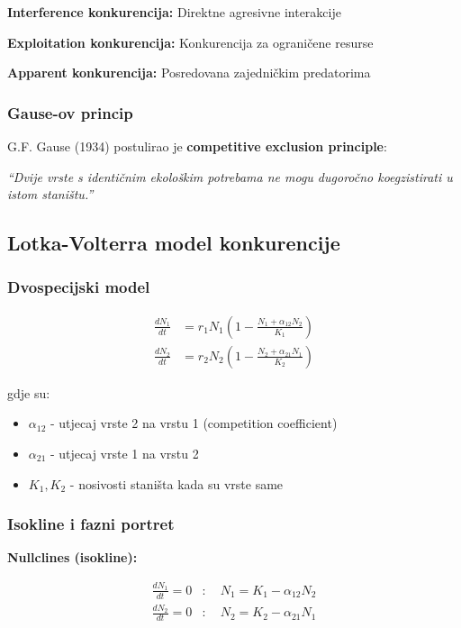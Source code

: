 \documentclass[11pt,oneside]{book}
\begin{document}
\textbf{Interference konkurencija:} Direktne agresivne interakcije

\textbf{Exploitation konkurencija:} Konkurencija za ograničene resurse

\textbf{Apparent konkurencija:} Posredovana zajedničkim predatorima

\subsubsection{Gause-ov princip}

G.F. Gause (1934) postulirao je \textbf{competitive exclusion principle}:

\textit{``Dvije vrste s identičnim ekološkim potrebama ne mogu dugoročno koegzistirati u istom staništu.''}

\subsection{Lotka-Volterra model konkurencije}

\subsubsection{Dvospecijski model}

\begin{align}
	\frac{dN_1}{dt} &= r_1 N_1 \left(1 - \frac{N_1 + \alpha_{12}N_2}{K_1}\right) \\
	\frac{dN_2}{dt} &= r_2 N_2 \left(1 - \frac{N_2 + \alpha_{21}N_1}{K_2}\right)
\end{align}

gdje su:
\begin{itemize}
	\item $\alpha_{12}$ - utjecaj vrste 2 na vrstu 1 (competition coefficient)
	\item $\alpha_{21}$ - utjecaj vrste 1 na vrstu 2  
	\item $K_1, K_2$ - nosivosti staništa kada su vrste same
\end{itemize}

\subsubsection{Isokline i fazni portret}

\textbf{Nullclines (isokline):}

\begin{align}
	\frac{dN_1}{dt} = 0 &: \quad N_1 = K_1 - \alpha_{12}N_2 \\
	\frac{dN_2}{dt} = 0 &: \quad N_2 = K_2 - \alpha_{21}N_1
\end{align}
\end{document}
